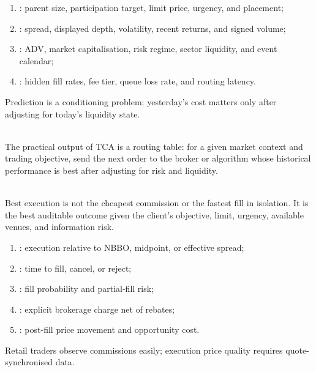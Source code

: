 \begin{taxonomy} 
\begin{enumerate}[label=\roman*.]
\setlength{\itemsep}{0pt}
\item {}: parent size, participation target, limit price, urgency, and placement;
\item {}: spread, displayed depth, volatility, recent returns, and signed volume;
\item {}: ADV, market capitalisation, risk regime, sector liquidity, and event calendar;
\item {}: hidden fill rates, fee tier, queue loss rate, and routing latency.
\end{enumerate}
Prediction is a conditioning problem: yesterday's cost matters only after adjusting for today's liquidity state.
\end{taxonomy}

\begin{practitionernote} \\
The practical output of TCA is a routing table: for a given market context and trading objective, send the next order to the broker or algorithm whose historical performance is best after adjusting for risk and liquidity.
\end{practitionernote}

\begin{principle} \\
Best execution is not the cheapest commission or the fastest fill in isolation. It is the best auditable outcome given the client's objective, limit, urgency, available venues, and information risk.
\end{principle}

\begin{taxonomy} 
\begin{enumerate}[label=\roman*.]
\setlength{\itemsep}{0pt}
\item {}: execution relative to NBBO, midpoint, or effective spread;
\item {}: time to fill, cancel, or reject;
\item {}: fill probability and partial-fill risk;
\item {}: explicit brokerage charge net of rebates;
\item {}: post-fill price movement and opportunity cost.
\end{enumerate}
Retail traders observe commissions easily; execution price quality requires quote-synchronised data.
\end{taxonomy}

